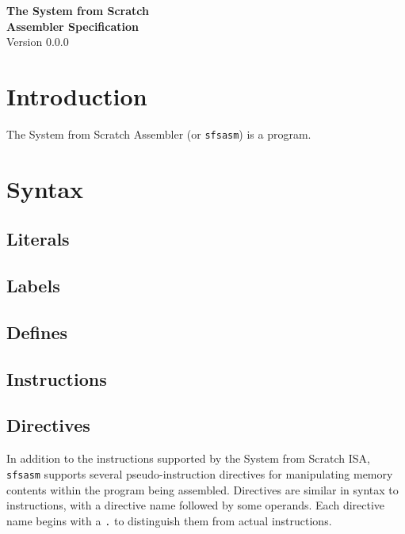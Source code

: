 


\vspace*{\fill}
\begin{flushright}
{\Huge\bf The System from Scratch\\Assembler Specification\\}
\vspace{2em}
{\Large Version 0.0.0}
\end{flushright}
\vspace*{\fill}
\pagebreak{}

\tableofcontents
\pagebreak{}

\section{Introduction}
The System from Scratch Assembler (or {\tt sfsasm}) is a program.

\section{Syntax}
\subsection{Literals}

\subsection{Labels}

\subsection{Defines}

\subsection{Instructions}

\subsection{Directives}
In addition to the instructions supported by the System from Scratch ISA, {\tt sfsasm} supports several pseudo-instruction directives for manipulating memory contents within the program being assembled. Directives are similar in syntax to instructions, with a directive name followed by some operands. Each directive name begins with a {\tt .} to distinguish them from actual instructions.

